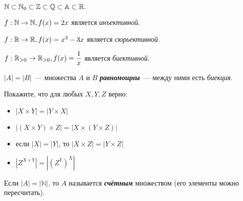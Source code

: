 \documentclass{article}
\begin{document}
    \begin{example}
        $\mathbb{N} \subset \mathbb{N}_0 \subset \mathbb{Z} \subset \mathbb{Q} \subset \mathbb{A} \subset \mathbb{R}.$
    \end{example}

    \begin{example}
        $f: \mathbb{N} \rightarrow \mathbb{N}, f(x) = 2x$ является \textit{инъективной}.
    \end{example}
    \begin{example}
        $f: \mathbb{R} \rightarrow \mathbb{R}, f(x) = x^3 - 3x$ является \textit{сюрьективной}.
    \end{example}
    \begin{example}
        $f: \mathbb{R}_{>0} \rightarrow \mathbb{R}_{>0}, f(x) = \dfrac{1}{x}$ является \textit{биективной}.
    \end{example}

    \begin{definition_boxed}
        $|A| = |B|$~--- множества $A$ и $B$ \textit{\textbf{равномощны}}~--- между ними есть \textit{биекция}.
    \end{definition_boxed}

    \begin{task_boxed}
        Покажите, что для любых $X, Y, Z$ верно: \\
        \newline
        \begin{minipage}[c]{0.5\textwidth}
            \begin{itemize}
                \item $|X\times Y|=|Y \times X|$
                \item $|(X\times Y)\times Z|=|X\times (Y \times Z)|$
            \end{itemize}
        \end{minipage}
        \begin{minipage}[c]{0.5\textwidth}
            \begin{itemize}
                \item если $|X|=|Y|$, то $|X\times Z|=|Y \times Z|$
                \item $|Z^{X\times Y}|=|(Z^Y)^X|$
            \end{itemize}
        \end{minipage}
    \end{task_boxed}

    \begin{example}
        Если $|A| = |\mathbb{N}|$, то $A$ называется \textbf{\textit{счётным}} множеством (его элементы можно пересчитать).
    \end{example}
\end{document}

